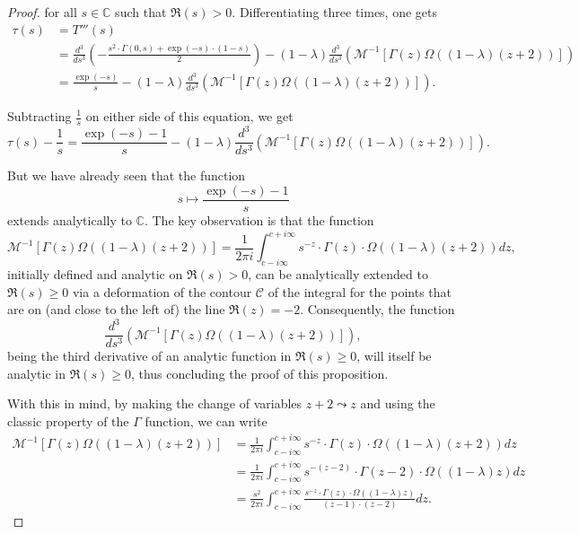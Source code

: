 \documentclass[10pt,a4paper]{amsart}
\newcommand{\C}{\mathbb{C}}
\newcommand{\difrac}{\displaystyle \frac}
\newcommand{\diint}{\displaystyle \int}
\begin{document}
\begin{proof}
\noindent for all $s \in \C$ such that $\Re(s) > 0$. Differentiating three times, one gets \begin{equation*} \begin{split} \tau(s) & = T'''(s) \\ & = \difrac{d^3}{ds^3} \left(-\difrac{s^2 \cdot \Gamma(0,s) + \exp(-s) \cdot (1-s)}{2}\right) - (1 - \lambda) \difrac{d^3}{ds^3} \left(\mathscr{M}^{-1}[\Gamma(z) \Omega((1 - \lambda)(z + 2))]\right) \\ & = \difrac{\exp(-s)}{s} - (1 - \lambda) \difrac{d^3}{ds^3} \left(\mathscr{M}^{-1}[\Gamma(z) \Omega((1 - \lambda)(z + 2))]\right). \end{split} \end{equation*}

Subtracting $\difrac{1}{s}$ on either side of this equation, we get $$\tau(s) - \difrac{1}{s} = \difrac{\exp(-s) - 1}{s} - (1 - \lambda) \difrac{d^3}{ds^3} \left(\mathscr{M}^{-1}[\Gamma(z) \Omega((1 - \lambda)(z + 2))]\right).$$

But we have already seen that the function $$s \mapsto \difrac{\exp(-s) - 1}{s}$$ extends analytically to $\C$. The key observation is that the function $$\mathscr{M}^{-1}[\Gamma(z) \Omega((1 - \lambda)(z + 2))] = \difrac{1}{2\pi i} \diint_{c - i\infty}^{c + i\infty} s^{-z} \cdot \Gamma(z) \cdot \Omega((1-\lambda)(z+2)) dz,$$ initially defined and analytic on $\Re(s) > 0$, can be analytically extended to $\Re(s) \geq 0$ via a deformation of the contour $\mathcal{C}$ of the integral for the points that are on (and close to the left of) the line $\Re(z) = -2$. Consequently, the function $$\difrac{d^3}{ds^3} \left(\mathscr{M}^{-1}[\Gamma(z) \Omega((1 - \lambda)(z + 2))]\right),$$ being the third derivative of an analytic function in $\Re(s) \geq 0$, will itself be analytic in $\Re(s) \geq 0$, thus concluding the proof of this proposition.

With this in mind, by making the change of variables $z + 2 \leadsto z$ and using the classic property of the $\Gamma$ function, we can write \begin{equation*} \begin{split} \mathscr{M}^{-1}[\Gamma(z) \Omega((1 - \lambda)(z + 2))] & = \difrac{1}{2\pi i} \diint_{c - i\infty}^{c + i\infty} s^{-z} \cdot \Gamma(z) \cdot \Omega((1-\lambda)(z+2)) dz \\ & = \difrac{1}{2\pi i} \diint_{c - i\infty}^{c + i\infty} s^{-(z - 2)} \cdot \Gamma(z-2) \cdot \Omega((1 - \lambda)z) dz \\ & = \difrac{s^2}{2\pi i} \diint_{c - i\infty}^{c + i\infty} \difrac{s^{-z} \cdot \Gamma(z) \cdot \Omega((1 - \lambda)z)}{(z - 1) \cdot (z - 2)} dz. \end{split} \end{equation*}


\end{proof}
\end{document}
